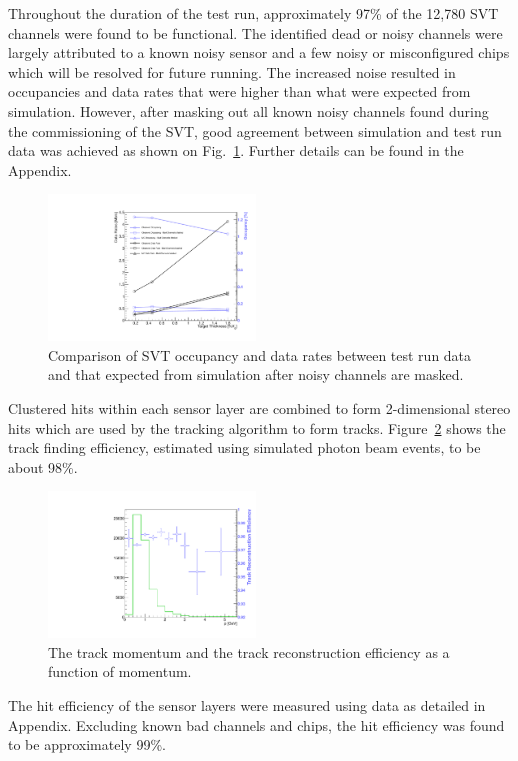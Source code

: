 Throughout the duration of the test run, approximately 97\% of the 12,780 SVT 
channels were found to be functional.
The identified dead or noisy channels were largely attributed to a 
known noisy sensor and a few noisy or misconfigured chips which will be resolved for future running. The 
increased noise resulted in occupancies and data rates that were higher than what were expected from simulation.
However, after masking out all known noisy channels found during the commissioning of the SVT, good agreement 
between simulation and test run data was achieved as shown on Fig.~\ref{fig:data_rates_data_mc_cmp}.
Further details can be found in the Appendix. 
\begin{figure}[h]
    \includegraphics[width=0.49\textwidth]{test2012/svtperformance/daq/data_rates.pdf}
        \caption{ { \small
                    Comparison of SVT occupancy and data rates between test run data and that expected from simulation after noisy channels are masked.
                } }
	\label{fig:data_rates_data_mc_cmp}
\end{figure}


Clustered hits within each sensor layer are combined to form 2-dimensional stereo hits which are used by the tracking 
algorithm to form tracks. Figure~\ref{fig:hit_track_efficiency} shows the track finding efficiency, estimated using
simulated photon beam events, to be about 98\%. 
\begin{figure}[h]
    	\includegraphics[width=0.49\textwidth]{test2012/svtperformance/trk_performance/track_reco_efficiency.pdf}
        \caption{{\small The track momentum and the track reconstruction efficiency
      	as a function of momentum.}} 
	\label{fig:hit_track_efficiency}
\end{figure}
The hit efficiency of the sensor layers were measured using data as detailed in
Appendix. Excluding known bad channels and chips, the hit efficiency was 
found to be approximately 99\%. 


